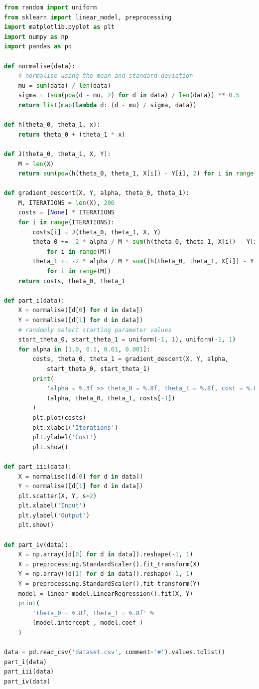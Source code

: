 \documentclass[12pt]{article}
\begin{document}
\begin{lstlisting}[language=Python]
from random import uniform
from sklearn import linear_model, preprocessing
import matplotlib.pyplot as plt
import numpy as np
import pandas as pd

def normalise(data):
    # normalise using the mean and standard deviation
    mu = sum(data) / len(data)
    sigma = (sum(pow(d - mu, 2) for d in data) / len(data)) ** 0.5
    return list(map(lambda d: (d - mu) / sigma, data))

def h(theta_0, theta_1, x):
    return theta_0 + (theta_1 * x)

def J(theta_0, theta_1, X, Y):
    M = len(X)
    return sum(pow(h(theta_0, theta_1, X[i]) - Y[i], 2) for i in range(M)) / M

def gradient_descent(X, Y, alpha, theta_0, theta_1):
    M, ITERATIONS = len(X), 200
    costs = [None] * ITERATIONS
    for i in range(ITERATIONS):
        costs[i] = J(theta_0, theta_1, X, Y)
        theta_0 += -2 * alpha / M * sum(h(theta_0, theta_1, X[i]) - Y[i]
            for i in range(M))
        theta_1 += -2 * alpha / M * sum((h(theta_0, theta_1, X[i]) - Y[i]) * X[i]
            for i in range(M))
    return costs, theta_0, theta_1

def part_i(data):
    X = normalise([d[0] for d in data])
    Y = normalise([d[1] for d in data])
    # randomly select starting parameter values
    start_theta_0, start_theta_1 = uniform(-1, 1), uniform(-1, 1)
    for alpha in [1.0, 0.1, 0.01, 0.001]:
        costs, theta_0, theta_1 = gradient_descent(X, Y, alpha,
            start_theta_0, start_theta_1)
        print(
            'alpha = %.3f >> theta_0 = %.8f, theta_1 = %.8f, cost = %.8f' %
            (alpha, theta_0, theta_1, costs[-1])
        )
        plt.plot(costs)
        plt.xlabel('Iterations')
        plt.ylabel('Cost')
        plt.show()

def part_iii(data):
    X = normalise([d[0] for d in data])
    Y = normalise([d[1] for d in data])
    plt.scatter(X, Y, s=2)
    plt.xlabel('Input')
    plt.ylabel('Output')
    plt.show()

def part_iv(data):
    X = np.array([d[0] for d in data]).reshape(-1, 1)
    X = preprocessing.StandardScaler().fit_transform(X)
    Y = np.array([d[1] for d in data]).reshape(-1, 1)
    Y = preprocessing.StandardScaler().fit_transform(Y)
    model = linear_model.LinearRegression().fit(X, Y)
    print(
        'theta_0 = %.8f, theta_1 = %.8f' %
        (model.intercept_, model.coef_)
    )

data = pd.read_csv('dataset.csv', comment='#').values.tolist()
part_i(data)
part_iii(data)
part_iv(data)
\end{lstlisting}
\end{document}
